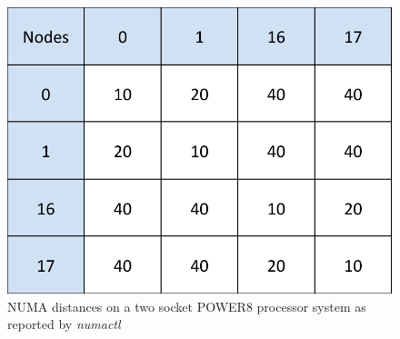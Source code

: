 \begin{figure}[h]
  \centering
  \includegraphics[height=0.3\textwidth]{./Images/crest.pdf}
       \caption{NUMA distances on a two socket POWER8 processor system as reported by \textit{numactl}}
       \label{fig:crest}
\end{figure}




 
